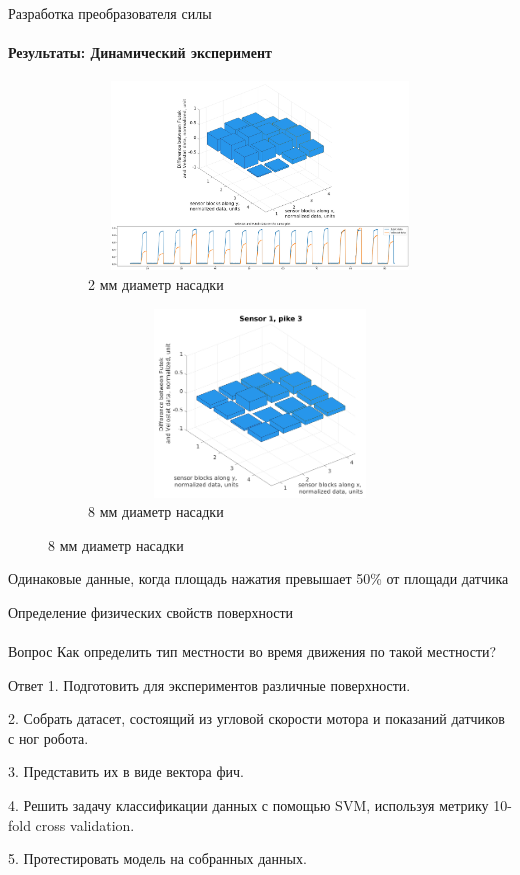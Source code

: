 \documentclass[aspectratio=169,xcolor=table]{beamer}
\begin{document}
\begin{frame}[t]{Разработка преобразователя силы}
    \framesubtitle{Результаты: Динамический эксперимент}
    \vspace{-15pt}
    \begin{figure}[H]
        \begin{subfigure}{0.64\textwidth}
            \centering\includegraphics[height=5cm,width=1\textwidth,keepaspectratio]{sens1_pike1_mod.png}
            \caption*{2 мм диаметр насадки}
            \label{fig:sens1_pike1}
        \end{subfigure}
        \begin{subfigure}{0.34\textwidth}
            \centering\includegraphics[height=5cm,width=1\textwidth,keepaspectratio]{sens1_pike3.png}
            \caption*{8 мм диаметр насадки}
            \label{fig:sens1_pike3}
        \end{subfigure}
    \end{figure}
    \vspace{-0.8cm}
    \alert{Одинаковые данные, когда площадь нажатия превышает 50\% от площади датчика}
\end{frame}

\begin{frame}[t]{Определение физических свойств поверхности}
    \framesubtitle{}
    \vspace{-0.3cm}
    {\large\begin{block}{Вопрос}
        Как определить тип местности во время движения по такой местности?
        \end{block}}
    {\large\begin{alertblock}{Ответ}
        1. Подготовить для экспериментов различные поверхности.

        2. Собрать датасет, состоящий из угловой скорости мотора и показаний датчиков с ног робота.

        3. Представить их в виде вектора фич.

        4. Решить задачу классификации данных с помощью SVM, используя метрику 10-fold cross validation. 

        5. Протестировать модель на собранных данных.
        \end{alertblock}}
\end{frame}
\end{document}

